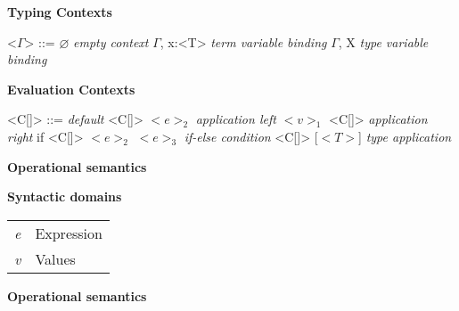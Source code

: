 \documentclass[11pt,oneside]{book}
\newcommand{\synlabel}[1]{\hfill \textit{#1}}
\begin{document}
\textbf{Typing Contexts}

\begin{grammar}

    <$\Gamma$> ::=  $\varnothing$                          \synlabel{empty context}
               \alt \syntleft $\Gamma$\syntright, x:<T>    \synlabel{term variable binding}
               \alt \syntleft $\Gamma$\syntright, X        \synlabel{type variable binding}

\end{grammar}

\textbf{Evaluation Contexts}

\begin{grammar}

    <C[\textbullet]> ::=  \textbullet                          \synlabel{default}
                     \alt <C[\textbullet]> $<e>_2$             \synlabel{application left}
                     \alt $<v>_1$ <C[\textbullet]>             \synlabel{application right}
                     \alt if <C[\textbullet]> $<e>_2$ $<e>_3$  \synlabel{if-else condition}
                     \alt <C[\textbullet]> [$<T>$]             \synlabel{type application}

\end{grammar}

\break

\hfill
\begin{center}
{
    \bf
    \huge
    Operational semantics
}
\end{center}

\textbf{Syntactic domains}

\begin{tabular}{ l l }
    \textit{e} & Expression \\
    \textit{v} & Values \\
\end{tabular}

\hfill\break

\textbf{Operational semantics}

\begin{center}
\end{center}

\begin{prooftree}
\end{prooftree}
\end{document}
